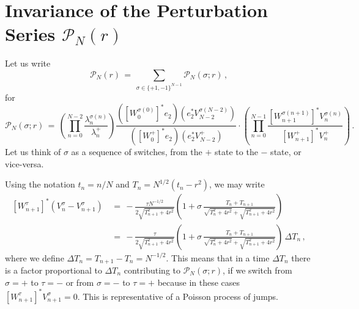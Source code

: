 \documentclass[12pt]{report}
\newcommand{\be}{\begin{equation}}
\newcommand{\ee}{\end{equation}}
\theoremstyle{definition}
\begin{document}
\section{Invariance of the Perturbation Series $\mathcal{P}_N(r)$}

Let us write
\be
\mathcal{P}_N(r)\, =\, \sum_{\sigma \in \{+1,-1\}^{N-1}} \mathcal{P}_N(\sigma;r)\, ,
\ee
for 
\be
\mathcal{P}_N(\sigma;r)\,
=\, 
\left(\prod_{n=0}^{N-2} \frac{\lambda_n^{\sigma(n)}}{\lambda_n^+}\right)
\frac{([W_0^{\sigma(0)}]^* e_2) (e_2^* V_{N-2}^{\sigma(N-2)})}{([W_0^{+}]^* e_2) (e_2^* V_{N-2}^{+})}
\cdot \left(\prod_{n=0}^{N-1} \frac{[W_{n+1}^{\sigma(n+1)}]^* V_n^{\sigma(n)}}
{[W_{n+1}^{+}]^* V_n^{+}}\right)\, .
\ee
Let us think of $\sigma$ as a sequence of switches, from the $+$ state to the $-$ state, or vice-versa.

Using the notation $t_n = n/N$ and $T_n = N^{1/2} (t_n-r^2)$, we may write
\be
\begin{split}
[W_{n+1}^{\tau}]^* (V_n^{\sigma}-V_{n+1}^{\sigma})\,
&=\, -\frac{\tau N^{-1/2}}{2 \sqrt{T_{n+1}^2+4r^2}}
\left(1+\sigma\, \frac{T_{n}+T_{n+1}}{\sqrt{T_{n}^2+4r^2}+\sqrt{T_{n+1}^2+4r^2}}\right)\\
&=\, -\frac{\tau}{2 \sqrt{T_{n+1}^2+4r^2}}
\left(1+\sigma\, \frac{T_{n}+T_{n+1}}{\sqrt{T_{n}^2+4r^2}+\sqrt{T_{n+1}^2+4r^2}}\right)\, \Delta T_n\, ,
\end{split}
\ee
where we define $\Delta T_n = T_{n+1}-T_n=N^{-1/2}$.
This means that in a time $\Delta T_n$ there is a factor proportional to $\Delta T_n$ contributing to $\mathcal{P}_N(\sigma;r)$,
if we switch from $\sigma=+$ to $\tau=-$ or from $\sigma=-$ to $\tau=+$ because in these cases $[W_{n+1}^{\tau}]^*V_{n+1}^{\sigma}=0$.
This is representative of a Poisson process of jumps.
\end{document}
